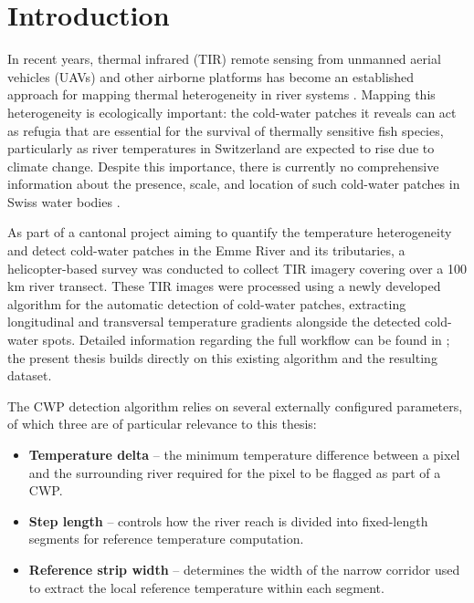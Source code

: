 \chapter{Introduction}

In recent years, thermal infrared (TIR) remote sensing from unmanned aerial 
vehicles (UAVs) and other airborne platforms has become an established approach 
for mapping thermal heterogeneity in river systems
\citep{casas-mulet_unmanned_2020,kuhn_assessing_2021,torgersen_airborne_2001,
	dugdale_practitioners_2016}. Mapping this heterogeneity is ecologically important: 
the cold-water patches it reveals can act as refugia that are essential for the 
survival of thermally sensitive fish species, particularly as river temperatures 
in Switzerland are expected to rise due to climate change. 
Despite this importance, there is currently no comprehensive information about the 
presence, scale, and location of such cold-water patches in Swiss water bodies 
\citep{tonolla_thermische-kartographie_2026, tonolla_thermoscanning_2021}.

As part of a cantonal project aiming to quantify the temperature heterogeneity 
and detect cold-water patches in the Emme River and its tributaries, a 
helicopter-based survey was conducted to collect TIR imagery covering 
over a 100 km river transect. These TIR images were processed using a newly 
developed algorithm for the automatic detection of cold-water patches, extracting 
longitudinal and transversal temperature gradients alongside the detected 
cold-water spots. Detailed information regarding the full workflow can be found 
in \citep{tonolla_thermische-kartographie_2026, tonolla_thermoscanning_2021}; the 
present thesis builds directly on this existing algorithm and the resulting 
dataset.

The CWP detection algorithm relies on several externally configured parameters, 
of which three are of particular relevance to this thesis: 

\begin{itemize}
	\item \textbf{Temperature delta} -- the minimum temperature difference 
	between a pixel and the surrounding river required for the pixel to be 
	flagged as part of a CWP.
	\item \textbf{Step length} -- controls how the river reach is divided 
	into fixed-length segments for reference temperature computation.
	\item \textbf{Reference strip width} -- determines the width of the 
	narrow corridor used to extract the local reference temperature within 
	each segment.
\end{itemize} 

